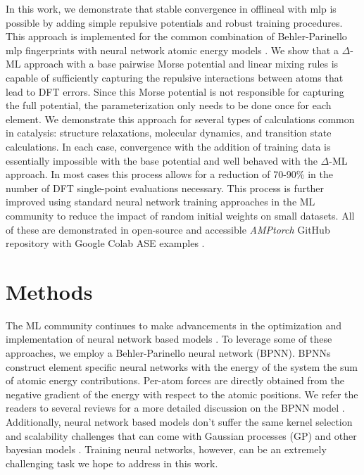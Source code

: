 \documentclass[%
 reprint,
 amsmath,amssymb,
 aps,
]{revtex4-2}
\begin{document}
In this work, we demonstrate that stable convergence in \gls{offlineal} with \gls{mlp} is possible by adding simple repulsive potentials and robust training procedures. This approach is implemented for the common combination of Behler-Parinello \gls{mlp} fingerprints with neural network atomic energy models \cite{Behler2007}. We show that a $\Delta$-ML approach with a base pairwise Morse potential and linear mixing rules is capable of sufficiently capturing the repulsive interactions between atoms that lead to \gls{DFT} errors. Since this Morse potential is not responsible for capturing the full potential, the parameterization only needs to be done once for each element. We demonstrate this approach for several types of calculations common in catalysis: structure relaxations, molecular dynamics, and transition state calculations. In each case, convergence with the addition of training data is essentially impossible with the base potential and well behaved with the $\Delta$-ML approach. In most cases this process allows for a reduction of 70-90\% in the number of DFT single-point evaluations necessary.  This process is further improved using standard neural network training approaches in the ML community to reduce the impact of random initial weights on small datasets. All of these are demonstrated in open-source and accessible \textit{AMPtorch} GitHub repository with Google Colab ASE examples \cite{amptorch, examples}. 

\section{Methods}
The ML community continues to make advancements in the optimization and implementation of neural network based models \cite{Loshchilov2019, Fey2019, Paszke2019}. To leverage some of these approaches, we employ a Behler-Parinello neural network (BPNN). BPNNs construct element specific neural networks with the energy of the system the sum of atomic energy contributions. Per-atom forces are directly obtained from the negative gradient of the energy with respect to the atomic positions. We refer the readers to several reviews for a more detailed discussion on the BPNN model \cite{Behler2007, Behler2016, Khorshidi2016}. Additionally, neural network based models don't suffer the same kernel selection and scalability challenges that can come with Gaussian processes (GP) and other bayesian models \cite{Bartok2015}. Training neural networks, however, can be an extremely challenging task we hope to address in this work.
\end{document}
